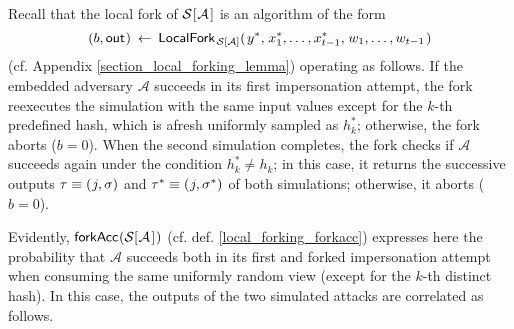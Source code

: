 \documentclass{iacrtrans}
\begin{document}
Recall that the local fork of
$\mathcal{S}\hspace{0.5pt}[\hspace{0.5pt}\mathcal{A}\hspace{1pt}]$
is an algorithm of the form
\vspace{5pt}
\begin{equation*}
(
	\vspace{1pt}
	b,
	\vspace{1pt}
	\mathsf{out}
	\hspace{0.5pt}
)
\hspace{2pt}
\leftarrow
\hspace{2pt}
\mathsf{LocalFork}_{
		\hspace{1pt}
    	\mathcal{S}\hspace{0pt}[
    		\hspace{0pt}
    		\mathcal{A}
    		\hspace{0pt}
    	]
    }
	(
   		\hspace{1pt}
		y ^*,
		\hspace{1pt}
		x_1^*, \dots, x_{t-1}^*,
		\hspace{1pt}
		w_1, \dots, w_{t-1}
		\hspace{1pt}
   	)
\vspace{5pt}
\end{equation*}
(cf. Appendix \ref{section_local_forking_lemma})
operating as follows.
If the embedded adversary $\mathcal{A}$
succeeds in its first
impersonation attempt,
the fork reexecutes the simulation
with the same input values except
for the $k$-th predefined hash,
which is afresh uniformly sampled as $h_k^*$;
otherwise, the fork aborts ($b=0$).
When the second simulation completes,
the fork checks if $\mathcal{A}$
succeeds again under the condition $h_k^* \neq h_k$;
in this case, it returns the successive outputs
$\tau \equiv (\hspace{0.5pt}j, \sigma)$
and $\tau^* \equiv (\hspace{0.5pt}j, \sigma^*)$
of both simulations; otherwise, it aborts ($b=0$).

Evidently,
$
\mathsf{forkAcc}
\hspace{0.5pt}
(
	\mathcal{S}
	[
		\hspace{0.5pt}
		\mathcal{A}
		\hspace{1pt}
	]
	\hspace{0.5pt}
)
$
(cf. def. \eqref{local_forking_forkacc})
expresses here the probability that $\mathcal{A}$
succeeds both in its first and forked impersonation attempt
when consuming the same uniformly random
view (except for the $k$-th distinct hash).
In this case,
the outputs of the two simulated attacks are correlated as follows.
\end{document}
